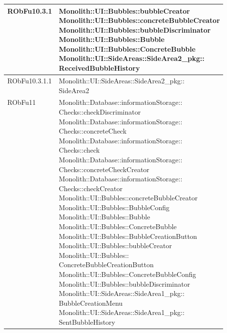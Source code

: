 \begin{center}
\begin{longtable}{|
*{1}{>{\centering\arraybackslash}m{2.5cm}|}
*{1}{>{\centering\arraybackslash}m{7.5cm}|}}
RObFu10.3.1 & \makecell[l]{Monolith::UI::Bubbles::bubbleCreator
\\Monolith::UI::Bubbles::concreteBubbleCreator
\\Monolith::UI::Bubbles::bubbleDiscriminator
\\Monolith::UI::Bubbles::Bubble
\\Monolith::UI::Bubbles::ConcreteBubble
\\Monolith::UI::SideAreas::SideArea2\_pkg:: \\ \hfill ReceivedBubbleHistory
\\}\\\hline
RObFu10.3.1.1 & \makecell[l]{Monolith::UI::SideAreas::SideArea2\_pkg:: \\ \hfill SideArea2
\\}\\\hline
RObFu11 & \makecell[l]{Monolith::Database::informationStorage:: \\ \hfill Checks::checkDiscriminator
\\Monolith::Database::informationStorage:: \\ \hfill Checks::concreteCheck
\\Monolith::Database::informationStorage:: \\ \hfill Checks::check
\\Monolith::Database::informationStorage:: \\ \hfill Checks::concreteCheckCreator
\\Monolith::Database::informationStorage:: \\ \hfill Checks::checkCreator
\\Monolith::UI::Bubbles::concreteBubbleCreator
\\Monolith::UI::Bubbles::BubbleConfig
\\Monolith::UI::Bubbles::Bubble
\\Monolith::UI::Bubbles::ConcreteBubble
\\Monolith::UI::Bubbles::BubbleCreationButton
\\Monolith::UI::Bubbles::bubbleCreator
\\Monolith::UI::Bubbles:: \\ \hfill ConcreteBubbleCreationButton
\\Monolith::UI::Bubbles::ConcreteBubbleConfig
\\Monolith::UI::Bubbles::bubbleDiscriminator
\\Monolith::UI::SideAreas::SideArea1\_pkg:: \\ \hfill BubbleCreationMenu
\\Monolith::UI::SideAreas::SideArea1\_pkg:: \\ \hfill SentBubbleHistory
}
\end{longtable}
\end{center}
